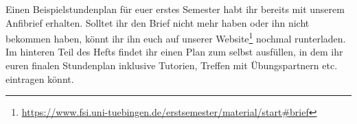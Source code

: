 Einen Beispielstundenplan für euer erstes Semester habt ihr bereits mit unserem Anfibrief erhalten. Solltet ihr den Brief nicht mehr haben oder ihn nicht bekommen haben, könnt ihr ihn euch auf unserer Website\footnote{\url{https://www.fsi.uni-tuebingen.de/erstsemester/material/start\#brief}} nochmal runterladen.\\
Im hinteren Teil des Hefts findet ihr einen Plan zum selbst ausfüllen, in dem ihr euren finalen Stundenplan inklusive Tutorien, Treffen mit Übungspartnern etc. eintragen könnt.

